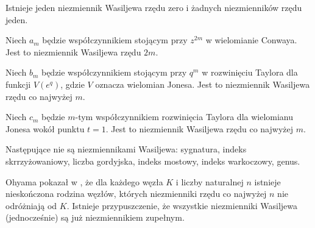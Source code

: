 Istnieje jeden niezmiennik Wasiljewa rzędu zero i żadnych niezmienników rzędu jeden.

\begin{example}
	Niech $a_m$ będzie współczynnikiem stojącym przy $z^{2m}$ w wielomianie Conwaya.
	Jest to niezmiennik Wasiljewa rzędu $2m$.
\end{example}

\begin{example}
	Niech $b_m$ będzie współczynnikiem stojącym przy $q^m$ w rozwinięciu Taylora dla funkcji $V(e^q)$, gdzie $V$ oznacza wielomian Jonesa.
	Jest to niezmiennik Wasiljewa rzędu co najwyżej $m$.
\end{example}

\begin{example}
	Niech $c_m$ będzie $m$-tym współczynnikiem rozwinięcia Taylora dla wielomianu Jonesa wokół punktu $t = 1$.
	Jest to niezmiennik Wasiljewa rzędu co najwyżej $m$.
\end{example}


Następujące nie są niezmiennikami Wasiljewa: sygnatura, indeks skrrzyżowaniowy, liczba gordyjska, indeks mostowy, indeks warkoczowy, genus.

Ohyama pokazał w \cite{ohyama95}, że dla każdego węzła $K$ i liczby naturalnej $n$ istnieje nieskończona rodzina węzłów, których niezmienniki rzędu co najwyżej $n$ nie odróżniają od $K$.
Istnieje przypuszczenie, że wszystkie niezmienniki Wasiljewa (jednocześnie) są już niezmiennikiem zupełnym.